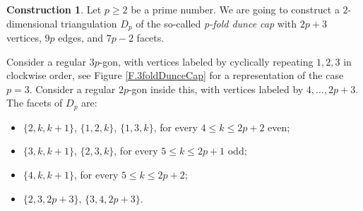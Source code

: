 \documentclass[11pt,oneside]{amsart}
\theoremstyle{plain}
\theoremstyle{definition}
\newtheorem{construction}[theorem]{Construction}
\begin{document}
\begin{construction}\label{C.pfoldDunceCap}
Let $p \geq 2$ be a prime number. We are going to construct a $2$-dimensional triangulation $D_p$ of the so-called {\em p-fold dunce cap} with $2p+3$ vertices, $9p$ edges, and $7p-2$ facets.

Consider a regular $3p$-gon, with vertices labeled by cyclically repeating $1,2,3$ in clockwise order, see Figure \ref{F.3foldDunceCap} for a representation of the case $p=3$. Consider a regular $2p$-gon inside this, with vertices labeled by $4,\ldots,2p+3$. The facets of $D_p$ are:
\begin{itemize}
\item $\{2,k,k+1\}$, $\{1,2,k\}$, $\{1,3,k\}$, for every $4 \leq k \leq 2p+2$ even;
\item $\{3,k,k+1\}$, $\{2,3,k\}$, for every $5 \leq k \leq 2p+1$ odd;
\item $\{4,k,k+1\}$, for every  $5 \leq k \leq 2p+2$;
\item $\{2,3,2p+3\}$, $\{3,4,2p+3\}$.
\end{itemize}


\end{construction}
\end{document}
